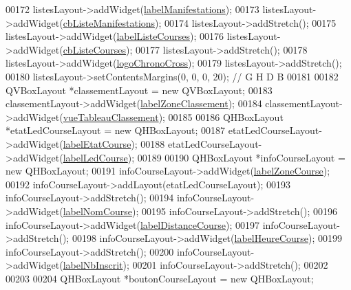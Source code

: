 \begin{DoxyCode}
00172     listesLayout->addWidget(\hyperlink{class_i_h_m_chrono_cross_a7430cf36cc48d17297ddc03fe69e9b72}{labelManifestations});
00173     listesLayout->addWidget(\hyperlink{class_i_h_m_chrono_cross_a4b7a6af527d8d2d28d8ea6ea7cbfac75}{cbListeManifestations});
00174     listesLayout->addStretch();
00175     listesLayout->addWidget(\hyperlink{class_i_h_m_chrono_cross_a2b563f2574ad86acaecc01f0357f85be}{labelListeCourses});
00176     listesLayout->addWidget(\hyperlink{class_i_h_m_chrono_cross_af47891e3e9f2bb2c955be8c128e830b5}{cbListeCourses});
00177     listesLayout->addStretch();
00178     listesLayout->addWidget(\hyperlink{class_i_h_m_chrono_cross_a76f2f83c624da73e3d3de6a8b4ff43a1}{logoChronoCross});
00179     listesLayout->addStretch();
00180     listesLayout->setContentsMargins(0, 0, 0, 20); \textcolor{comment}{// G H D B}
00181 
00182     QVBoxLayout *classementLayout = \textcolor{keyword}{new} QVBoxLayout;
00183     classementLayout->addWidget(\hyperlink{class_i_h_m_chrono_cross_ac07ff8651a5a929f8847fa85eef9fe89}{labelZoneClassement});
00184     classementLayout->addWidget(\hyperlink{class_i_h_m_chrono_cross_a199204276756844adbd6ca3c9030ad2f}{vueTableauClassement});
00185 
00186     QHBoxLayout *etatLedCourseLayout = \textcolor{keyword}{new} QHBoxLayout;
00187     etatLedCourseLayout->addWidget(\hyperlink{class_i_h_m_chrono_cross_a433796aedfcc26313f639bd5157b1135}{labelEtatCourse});
00188     etatLedCourseLayout->addWidget(\hyperlink{class_i_h_m_chrono_cross_a8568c80f2e2ffe96c81d2a94a2146159}{labelLedCourse});
00189 
00190     QHBoxLayout *infoCourseLayout = \textcolor{keyword}{new} QHBoxLayout;
00191     infoCourseLayout->addWidget(\hyperlink{class_i_h_m_chrono_cross_a7684bc78d49abe63f021ee623bea575e}{labelZoneCourse});
00192     infoCourseLayout->addLayout(etatLedCourseLayout);
00193     infoCourseLayout->addStretch();
00194     infoCourseLayout->addWidget(\hyperlink{class_i_h_m_chrono_cross_aebe86f4e614f568db5558bf99f1b44e6}{labelNomCourse});
00195     infoCourseLayout->addStretch();
00196     infoCourseLayout->addWidget(\hyperlink{class_i_h_m_chrono_cross_a4748740a4973bf62c408be380ac0ae77}{labelDistanceCourse});
00197     infoCourseLayout->addStretch();
00198     infoCourseLayout->addWidget(\hyperlink{class_i_h_m_chrono_cross_ad071b8c6ecc126fca3e17e58e83942d9}{labelHeureCourse});
00199     infoCourseLayout->addStretch();
00200     infoCourseLayout->addWidget(\hyperlink{class_i_h_m_chrono_cross_a9d410e8bc161481a83298176b2702519}{labelNbInscrit});
00201     infoCourseLayout->addStretch();
00202 
00203 
00204     QHBoxLayout *boutonCourseLayout = \textcolor{keyword}{new} QHBoxLayout;

\end{DoxyCode}
